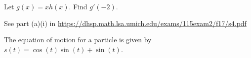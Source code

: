 \documentclass[11pt]{exam}
\begin{document}
\begin{questions}
\begin{center}
\end{center}
\vspace{-0.7cm}
Let \(g(x) = xh(x)\). Find \(g'(-2)\).
\begin{solution}
  See part (a)(i) in \href{https://dhsp.math.lsa.umich.edu/exams/115exam2/f17/s4.pdf}{https://dhsp.math.lsa.umich.edu/exams/115exam2/f17/s4.pdf}
\end{solution}
\question The equation of motion for a particle is given by \(s(t) =
  \cos(t) \sin(t) + \sin(t)\). 
\end{questions}
\end{document}
